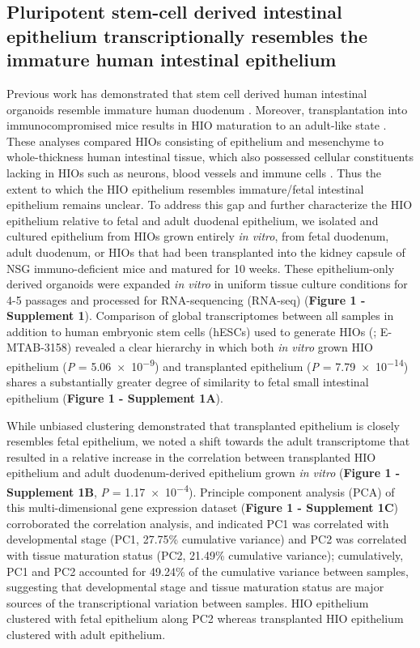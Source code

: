 \documentclass[9pt,lineo]{elife}
\begin{document}
\subsection*{{\bfseries\sffamily } Pluripotent stem-cell derived intestinal epithelium transcriptionally resembles the immature human intestinal epithelium}
\label{sec:orgheadline2}
Previous work has demonstrated that stem cell derived human intestinal organoids resemble immature human duodenum \citep{Watson:2014,Finkbeiner:2015,Tsai:2017}. Moreover, transplantation into immunocompromised mice results in HIO maturation to an adult-like state \citep{Watson:2014,Finkbeiner:2015}. These analyses compared HIOs consisting of epithelium and mesenchyme to whole-thickness human intestinal tissue, which also possessed cellular constituents lacking in HIOs such as neurons, blood vessels and immune cells  \citep{Finkbeiner:2015}. Thus the extent to which the HIO epithelium resembles immature/fetal intestinal epithelium remains unclear. To address this gap and further characterize the HIO epithelium relative to fetal and adult duodenal epithelium, we isolated and cultured epithelium from HIOs grown entirely \emph{in vitro}, from fetal duodenum, adult duodenum, or HIOs that had been transplanted into the kidney capsule of NSG immuno-deficient mice and matured for 10 weeks. These epithelium-only derived organoids were expanded \emph{in vitro} in uniform tissue culture conditions for 4-5 passages and processed for RNA-sequencing (RNA-seq) (\textbf{Figure 1 - Supplement 1}). Comparison of global transcriptomes between all samples in addition to human embryonic stem cells (hESCs) used to generate HIOs (\citealt{Finkbeiner:2015}; E-MTAB-3158) revealed a clear hierarchy in which both \emph{in vitro} grown HIO epithelium (\emph{P} = \num{5.06e-9}) and transplanted epithelium (\emph{P} = \num{7.79e-14}) shares a substantially greater degree of similarity to fetal small intestinal epithelium (\textbf{Figure 1 - Supplement 1A}). 

While unbiased clustering demonstrated that transplanted epithelium is closely resembles fetal epithelium, we noted a shift towards the adult transcriptome that resulted in a relative increase in the correlation between transplanted HIO epithelium and adult duodenum-derived epithelium grown \emph{in vitro}  (\textbf{Figure 1 - Supplement 1B}, \emph{P} = \num{1.17e-4}). Principle component analysis (PCA) of this multi-dimensional gene expression dataset (\textbf{Figure 1 - Supplement 1C}) corroborated the correlation analysis, and indicated PC1 was correlated with developmental stage  (PC1, 27.75\% cumulative variance) and PC2 was correlated with tissue maturation status (PC2, 21.49\% cumulative variance); cumulatively, PC1 and PC2 accounted for 49.24\% of the cumulative variance between samples, suggesting that developmental stage and tissue maturation status are major sources of the transcriptional variation between samples. HIO epithelium clustered with fetal epithelium along PC2 whereas transplanted HIO epithelium clustered with adult epithelium.
\end{document}
